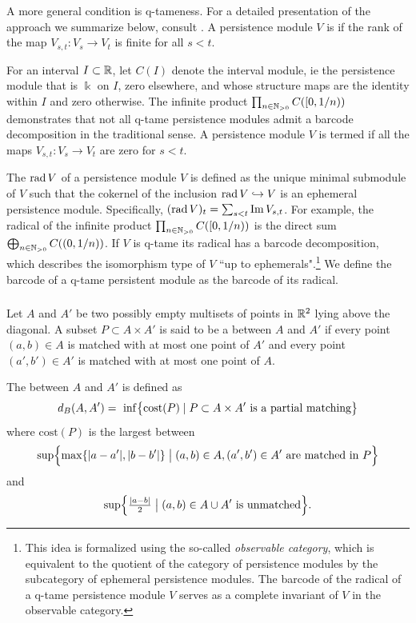 A more general condition is q-tameness.
For a detailed presentation of the approach we summarize below, consult \cite{Chazal.2016a, Chazal.2016b}.
A persistence module \(V\) is  if the rank of the map \(V_{s,t} \colon V_s \to V_t\) is finite for all \(s < t\).

For an interval \(I \subset \R\), let \(C(I)\) denote the interval module, ie the persistence module that is \(\Bbbk\) on \(I\), zero elsewhere, and whose structure maps are the identity within \(I\) and zero otherwise.
The infinite product \(\prod_{n \in \N_{> 0}} C([0,1/n))\) demonstrates that not all q-tame persistence modules admit a barcode decomposition in the traditional sense.
A persistence module \(V\) is termed  if all the maps \(V_{s,t} \colon V_s \to V_t\) are zero for \(s < t\).

The  \(\rad V\) of a persistence module \(V\) is defined as the unique minimal submodule of \(V\) such that the cokernel of the inclusion \(\rad V \hookrightarrow V\) is an ephemeral persistence module.
Specifically, \((\rad V)_t = \sum_{s<t} \img V_{s,t}\).
For example, the radical of the infinite product \(\prod_{n \in \N_{> 0}} C([0, 1/n))\) is the direct sum \(\bigoplus_{n \in \N_{> 0}} C((0,1/n))\).
If \(V\) is q-tame its radical has a barcode decomposition, which describes the isomorphism type of \(V\) ``up to ephemerals".\footnote{
This idea is formalized using the so-called \textit{observable category}, which is equivalent to the quotient of the category of persistence modules by the subcategory of ephemeral persistence modules.
The barcode of the radical of a q-tame persistence module \(V\) serves as a complete invariant of \(V\) in the observable category.}
We define the barcode of a q-tame persistent module as the barcode of its radical.

\subsubsection{}
\label{ss:algebraic_stability}
Let $A$ and $A'$ be two possibly empty multisets of points in $\R^2$ lying above the diagonal.
A subset $P \subset A \times A'$ is said to be a  between $A$ and $A'$ if every point $(a, b) \in A$ is matched with at most one point of $A'$ and every point $(a', b') \in A'$ is matched with at most one point of $A$.

The  between $A$ and $A'$ is defined as
\[
d_B(A, A') = \
\inf \set[\big]{\mathrm{cost}(P) \mid P \subset A \times A' \text{ is a partial matching}}
\]
where $\mathrm{cost}(P)$ is the largest between
\[
\sup \set[\Big]{\max\set{|a - a'|, |b - b'|} \bigm| (a, b) \in A, (a', b') \in A' \text{ are matched in }P}
\]
and
\[
\sup \set[\Big]{\tfrac{ |a - b|}{2} \bigm| (a, b) \in A \cup A' \text{ is unmatched}}.
\]

